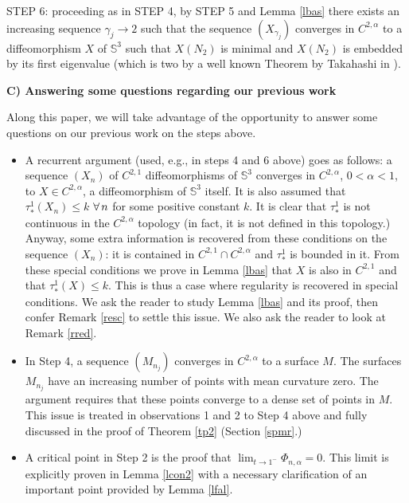 \documentclass{article}
\def\S3{{\mathbb S^3}}
\begin{document}
\noindent
\hspace{.05in}STEP 6: proceeding as in STEP 4, by STEP 5 and Lemma \ref{lbas} there exists  an increasing sequence  $\gamma_j \to 2$ such that the sequence $(X_{\gamma_j})$ converges in $C^{2,\alpha}$ to a diffeomorphism $X$ of $\S3$ such that $X(N_2)$ is minimal and $X(N_2)$ is embedded by its first eigenvalue (which is two by a well known Theorem by Takahashi in \cite{tk}).\bigskip




\noindent
{\bf C) Answering some questions regarding our previous work \cite{p1}}\bigskip 

Along this paper, we will take  advantage of the opportunity to answer
some questions on our previous work \cite{p1} on the steps above.

\begin{itemize}
\item A recurrent argument (used, e.g., in steps 4 and 6 above) goes as follows: a sequence $(X_n)$ of $C^{2,1}$ diffeomorphisms of $\S3$  converges in $C^{2,\alpha}$, $0<\alpha<1$, to $X\in C^{2,\alpha}$, a diffeomorphism of $\S3$ itself.  It is also assumed that $\tau_*^1(X_n)\leq k$ $\forall\hspace{.02in} n$ for some positive constant $k$. It is clear that $\tau_*^1$ is not continuous in the $C^{2,\alpha}$ topology (in fact, it is not defined in this topology.) Anyway, some extra information is recovered from these conditions on the sequence $(X_n)$: it is contained in $C^{2,1}\cap C^{2,\alpha}$ and $\tau_*^1$ is bounded in it. From these special conditions we prove in Lemma \ref{lbas} that $X$ is also in $C^{2,1}$ and that $\tau_*^1(X)\leq k$. This is thus a case where regularity is recovered in special conditions. We ask the reader to study Lemma \ref{lbas} and its proof, then confer Remark \ref{resc} to settle this issue. We also ask the reader to look at Remark \ref{rred}.
\item In Step 4, a sequence $(M_{n_j})$ converges in $C^{2,\alpha}$ to a surface $M$. The surfaces $M_{n_j}$ have an increasing number of points with mean curvature zero. The argument requires that these points converge to a dense set of points in $M$. This issue is treated in observations 1 and 2 to Step 4 above and fully discussed in the proof of Theorem \ref{tp2} (Section \ref{spmr}.)
\item A critical point in Step 2 is the proof that $\lim_{t\to 1^-}\Phi_{n,\alpha}=0$. This limit is explicitly proven in Lemma \ref{lcon2} with a necessary clarification of an important point provided by Lemma \ref{lfal}.
\end{itemize}
\end{document}
